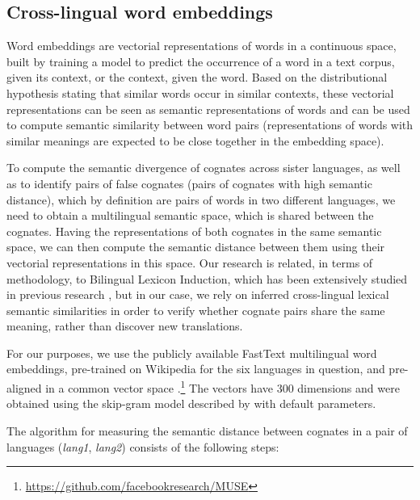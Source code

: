 \documentclass[output=paper]{langsci/langscibook}
\begin{document}
\subsection{Cross-lingual word embeddings}

Word embeddings are vectorial representations of words in a continuous space, built by training a model to predict the occurrence of a word in a text corpus, given its context, or the context, given the word. Based on the distributional hypothesis stating that similar words occur in similar contexts, these vectorial representations can be seen as semantic representations of words and can be used to compute semantic similarity between word pairs (representations of words with similar meanings are expected to be close together in the embedding space).

To compute the semantic divergence of cognates across sister languages, as well as to identify pairs of false cognates (pairs of cognates with high semantic distance), which by definition are pairs of words in two different languages, we need to obtain a multilingual semantic space, which is shared between the cognates. Having the representations of both cognates in the same semantic space, we can then compute the semantic distance between them using their vectorial representations in this space. Our research is related, in terms of methodology, to Bilingual Lexicon Induction, which has been extensively studied in previous research \citep{cognatesuban:mikolov2013exploiting,cognatesuban:heyman2017bilingual}, but in our case, we rely on inferred cross-lingual lexical semantic similarities in order to verify whether cognate pairs share the same meaning, rather than discover new translations.

For our purposes, we use the publicly available FastText \citep{bojanowski2017enriching} multilingual word embeddings, pre-trained on Wikipedia for the six languages in question, and pre-aligned in a common vector space \citep{cognatesuban:conneau2017word}.\footnote{\url{https://github.com/facebookresearch/MUSE}} The vectors have 300 dimensions and were obtained using the skip-gram model described by \citet{bojanowski2017enriching} with default parameters.

The algorithm for measuring the semantic distance between cognates in a pair of languages (\textit{lang1}, \textit{lang2}) consists of the following steps:\largerpage
\end{document}
